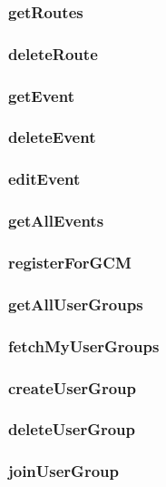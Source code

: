\subsubsection*{getRoutes}


\subsubsection*{deleteRoute}


\subsubsection*{getEvent}


\subsubsection*{deleteEvent}


\subsubsection*{editEvent}


\subsubsection*{getAllEvents}


\subsubsection*{registerForGCM}


\subsubsection*{getAllUserGroups}


\subsubsection*{fetchMyUserGroups}


\subsubsection*{createUserGroup}


\subsubsection*{deleteUserGroup}


\subsubsection*{joinUserGroup}


